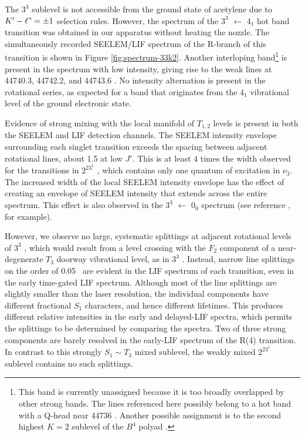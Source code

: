 The $3^3$  sublevel is not accessible from the ground state of
acetylene due to $K' - \ell" = \pm 1$ selection rules.  However, the
spectrum of the $3^3$  $\leftarrow$ $4_1$ hot band transition
was obtained in our apparatus without heating the nozzle.  The
simultaneously recorded SEELEM/LIF spectrum of the R-branch of this
transition is shown in Figure \ref{fig:spectrum-33k2}.  Another
interloping band\footnote{This band is currently unassigned because it
  is too broadly overlapped by other strong bands.  The lines
  referenced here possibly belong to a hot band with a Q-head near
  44736 \rcm.  Another possible assignment is to the second highest
  $K=2$ sublevel of the $B^4$ polyad \cite{merer-private}.} is present
in the spectrum with low intensity, giving rise to the weak lines at
44740.3, 44742.2, and 44743.6 \rcm.  No intensity alternation is
present in the rotational series, as expected for a band that
originates from the $4_1$ vibrational level of the ground electronic
state.

Evidence of strong mixing with the local manifold of $T_{1,2}$ levels
is present in both the SEELEM and LIF detection channels.  The SEELEM
intensity envelope surrounding each singlet transition exceeds the
spacing between adjacent rotational lines, about 1.5 \rcm at low $J'$.
This is at least 4 times the width observed for the transitions in
$2^23^1$ , which contains only one quantum of excitation in
$\nu_3$.  The increased width of the local SEELEM intensity envelope
has the effect of creating an envelope of SEELEM intensity that
extends across the entire spectrum.  This effect is also observed in
the $3^3$  $\leftarrow$ $0_0$ spectrum (see reference
\cite{humphrey97}, for example).  

However, we observe no large, systematic splittings at adjacent
rotational levels of $3^3$ , which would result from a level
crossing with the $F_2$ component of a near-degenerate $T_3$ doorway
vibrational level, as in $3^3$  \cite{mishra04}.  Instead,
narrow line splittings on the order of 0.05 \rcm\ are evident in the
LIF spectrum of each transition, even in the early time-gated LIF
spectrum.  Although most of the line splittings are slightly smaller
than the laser resolution, the individual components have different
fractional $S_1$ characters, and hence different lifetimes.  This
produces different relative intensities in the early and delayed-LIF
spectra, which permits the splittings to be determined by comparing
the spectra.  Two of three strong components are barely resolved in
the early-LIF spectrum of the R(4) transition.  In contrast to this
strongly $S_1 \sim T_3$ mixed sublevel, the weakly mixed $2^23^1$
 sublevel contains no such splittings.

